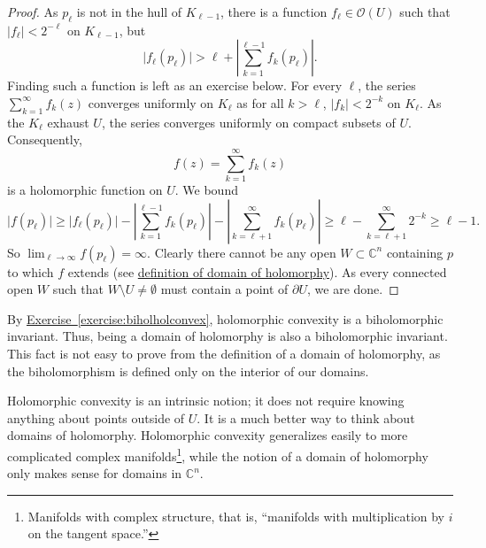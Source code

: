 \documentclass[12pt,openany]{book}
\newcommand{\sabs}[1]{\lvert {#1} \rvert}
\newcommand{\abs}[1]{\left\lvert {#1} \right\rvert}
\newcommand{\C}{{\mathbb{C}}}
\newcommand{\sO}{{\mathscr{O}}}
\theoremstyle{plain}
\theoremstyle{remark}
\theoremstyle{definition}
\theoremstyle{exercise}
\theoremstyle{example}
\newcommand{\exerciseref}[1]{\hyperref[#1]{Exercise~\ref*{#1}}}
\begin{document}
\begin{proof}
As $p_\ell$ is not in the hull of $K_{\ell-1}$, there is a function $f_\ell \in
\sO(U)$ such that $\sabs{f_\ell} < 2^{-\ell}$ on $K_{\ell-1}$, but
\begin{equation*}
\sabs{f_\ell(p_\ell)} > \ell + \abs{\sum_{k=1}^{\ell-1} f_k(p_\ell)} .
\end{equation*}
Finding such a function is left as an exercise below.
For every $\ell$, the series $\sum_{k=1}^\infty f_k(z)$ converges uniformly on
$K_\ell$
as for all $k > \ell$, $\sabs{f_k} < 2^{-k}$ on $K_\ell$.
As the $K_\ell$ exhaust $U$, the series converges uniformly on compact
subsets of $U$.  Consequently,
\begin{equation*}
f(z) = \sum_{k=1}^\infty f_k(z)
\end{equation*}
is a holomorphic function on $U$.  We bound
\begin{equation*}
\sabs{f(p_\ell)} \geq
\sabs{f_\ell(p_\ell)}
-
\abs{\sum_{k=1}^{\ell-1} f_k(p_\ell)}
-
\abs{\sum_{k=\ell+1}^\infty f_k(p_\ell)}
\geq
\ell
-
\sum_{k=\ell+1}^\infty 2^{-k}
\geq \ell-1 .
\end{equation*}
So $\lim_{\ell\to\infty} f(p_\ell) = \infty$.
Clearly there cannot be any open $W \subset \C^n$
containing $p$ to which $f$ extends (see
\hyperref[defn:domainofhol]{definition of domain of holomorphy}).  As every
connected open $W$ such that $W \setminus U \not= \emptyset$ must contain a
point of $\partial U$, we are done.
\end{proof}

By \exerciseref{exercise:biholholconvex},
holomorphic convexity is a biholomorphic invariant.
Thus,
being a domain of holomorphy is also a biholomorphic invariant.  This
fact is not easy to prove from the definition of a domain of
holomorphy, as the
biholomorphism is defined only on the interior of our domains.

Holomorphic convexity is an intrinsic notion; it does not require
knowing anything about points outside of $U$.  It is a much
better way to think about domains of holomorphy.  Holomorphic
convexity generalizes easily to more complicated complex
manifolds\footnote{Manifolds with complex structure, that is, ``manifolds
with multiplication by $i$ on the tangent space.''}, while
the notion of a domain of holomorphy only makes sense for domains in $\C^n$.
\end{document}
